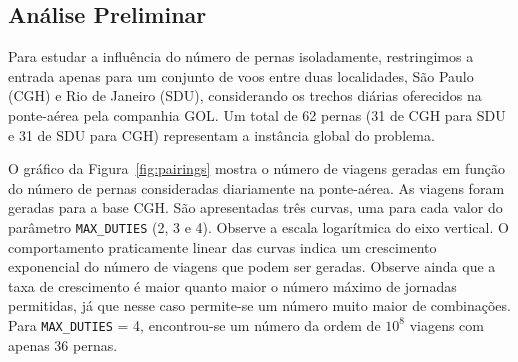 \documentclass[12pt,a4paper]{article}
\begin{document}

\subsection{Análise Preliminar}
\label{sec:analise_preliminar}

Para estudar a influência do número de pernas isoladamente, restringimos a entrada apenas para um
conjunto de voos entre duas localidades, São Paulo (CGH) e Rio de Janeiro (SDU), considerando os
trechos diárias oferecidos na ponte-aérea pela companhia GOL. Um total de 62 pernas (31 de CGH para 
SDU e 31 de SDU para CGH) representam a instância global do problema.

O gráfico da Figura~\ref{fig:pairings} mostra o número de viagens geradas em função do número de
pernas consideradas diariamente na ponte-aérea. As viagens foram geradas para a base CGH. São 
apresentadas três curvas, uma para cada valor do parâmetro \verb|MAX_DUTIES| (2, 3 e 4). Observe a 
escala logarítmica do eixo vertical. O comportamento praticamente linear das curvas indica um 
crescimento exponencial do número de viagens que podem ser geradas. Observe ainda que a taxa de 
crescimento é maior quanto maior o número máximo de jornadas permitidas, já que nesse caso 
permite-se um número muito maior de combinações. Para \verb|MAX_DUTIES| = 4, encontrou-se um número 
da ordem de $10^8$ viagens com apenas 36 pernas.
\end{document}
